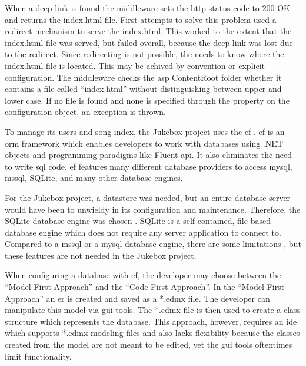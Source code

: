 When a deep link is found the middleware sets the \gls{http} status code to 200 OK and returns the index.html file. First attempts to solve this problem used a redirect mechanism to serve the index.html. This worked to the extent that the index.html file was served, but failed overall, because the deep link was lost due to the redirect. Since redirecting is not possible, the  needs to know where the index.html file is located. This may be achived by convention or explicit configuration. The middleware checks the \gls{asp} ContentRoot folder whether it contains a file called \enquote{index.html} without distinguishing between upper and lower case. If no file is found and none is specified through the  property on the configuration object, an exception is thrown.




To manage its users and song index, the Jukebox project uses the \gls{ef} \cite{efCore}. \gls{ef} is an \gls{orm} framework which enables developers to work with databases using .NET objects and programming paradigms like Fluent \gls{api}. It also eliminates the need to write \gls{sql} code. \gls{ef} features many different database providers to access \gls{mysql}, \gls{mssql}, SQLite, and many other database engines.

For the Jukebox project, a datastore was needed, but an entire database server would have been to unwieldy in its configuration and maintenance. Therefore, the SQLite database engine was chosen \cite{sqlite}. SQLite is a self-contained, file-based database engine which does not require any server application to connect to. Compared to a \gls{mssql} or a \gls{mysql} database engine, there are some limitations \cite{sqliteLimitations}, but these features are not needed in the Jukebox project.


When configuring a database with \gls{ef}, the developer may choose between the \enquote{Model-First-Approach} and the \enquote{Code-First-Approach}. In the \enquote{Model-First-Approach} an \gls{er} is created and saved as a *.edmx file. The developer can manipulate this model via \gls{gui} tools. The *.edmx file is then used to create a class structure which represents the database. This approach, however, requires an \gls{ide} which supports *.edmx modeling files and also lacks flexibility because the classes created from the model are not meant to be edited, yet the \gls{gui} tools oftentimes limit functionality.

